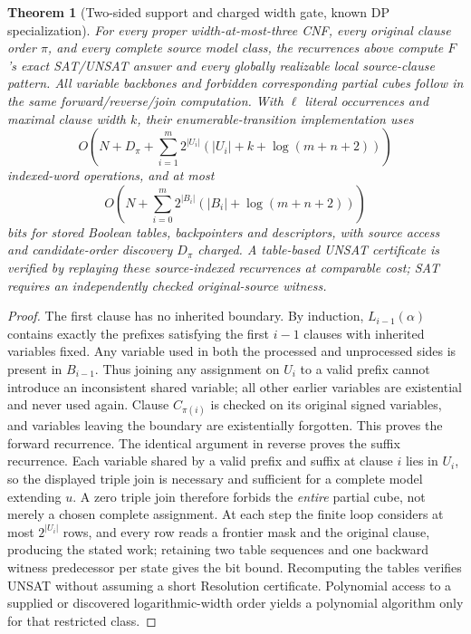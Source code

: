 \documentclass[10pt]{article}
\newtheorem{theorem}{Theorem}
\begin{document}
\begin{theorem}[Two-sided support and charged width gate, known DP specialization]
For every proper width-at-most-three CNF, every original clause order $\pi$, and every complete source model class, the recurrences above compute $F$'s exact SAT/UNSAT answer and every globally realizable local source-clause pattern. All variable backbones and forbidden corresponding partial cubes follow in the same forward/reverse/join computation. With $\ell$ literal occurrences and maximal clause width $k$, their enumerable-transition implementation uses
\[
 O\!\left(N+D_\pi+\sum_{i=1}^m 2^{|U_i|}(|U_i|+k+\log(m+n+2))\right)
\]
indexed-word operations, and at most
\[
 O\!\left(N+\sum_{i=0}^m 2^{|B_i|} (|B_i|+\log(m+n+2))\right)
\]
\emph{bits} for stored Boolean tables, backpointers and descriptors, with source access and candidate-order discovery $D_\pi$ charged. A table-based UNSAT certificate is verified by replaying these source-indexed recurrences at comparable cost; SAT requires an independently checked original-source witness.
\end{theorem}
\begin{proof}
The first clause has no inherited boundary. By induction, $L_{i-1}(\alpha)$ contains exactly the prefixes satisfying the first $i-1$ clauses with inherited variables fixed. Any variable used in both the processed and unprocessed sides is present in $B_{i-1}$. Thus joining any assignment on $U_i$ to a valid prefix cannot introduce an inconsistent shared variable; all other earlier variables are existential and never used again. Clause $C_{\pi(i)}$ is checked on its original signed variables, and variables leaving the boundary are existentially forgotten. This proves the forward recurrence. The identical argument in reverse proves the suffix recurrence. Each variable shared by a valid prefix and suffix at clause $i$ lies in $U_i$, so the displayed triple join is necessary and sufficient for a complete model extending $u$. A zero triple join therefore forbids the \emph{entire} partial cube, not merely a chosen complete assignment. At each step the finite loop considers at most $2^{|U_i|}$ rows, and every row reads a frontier mask and the original clause, producing the stated work; retaining two table sequences and one backward witness predecessor per state gives the bit bound. Recomputing the tables verifies UNSAT without assuming a short Resolution certificate. Polynomial access to a supplied or discovered logarithmic-width order yields a polynomial algorithm only for that restricted class.
\end{proof}
\end{document}
